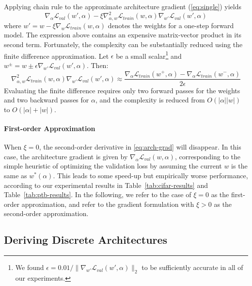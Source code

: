 \documentclass{article}
\begin{document}
Applying chain rule to the approximate architecture gradient (\eqref{eq:single}) yields
\begin{equation}
	\nabla_\alpha \mathcal{L}_{val}(w', \alpha) - \xi \nabla^2_{\alpha, w} \mathcal{L}_{train}(w, \alpha) \nabla_{w'} \mathcal{L}_{val}(w', \alpha) 
        \label{eq:arch-grad}
\end{equation}
where $w' = w - \xi \nabla_w \mathcal{L}_{train}(w, \alpha)$ denotes the weights for a one-step forward model.
The expression above contains an expensive matrix-vector product 
in its second term.
Fortunately,
the complexity can be substantially reduced using the finite difference approximation.
Let $\epsilon$ be a small scalar\footnote{We found $\epsilon = 0.01/\|\nabla_{w'} \mathcal{L}_{val}(w', \alpha)\|_2$ to be sufficiently accurate in all of our experiments.} and
$w^\pm = w \pm \epsilon \nabla_{w'} \mathcal{L}_{val}(w', \alpha)$. Then:
\begin{equation}
	\nabla^2_{\alpha, w} \mathcal{L}_{train}(w, \alpha) \nabla_{w'} \mathcal{L}_{val}(w', \alpha) 
	\approx
	\frac{\nabla_\alpha \mathcal{L}_{train}(w^+, \alpha) - \nabla_\alpha \mathcal{L}_{train}(w^-, \alpha)}{2 \epsilon}
\end{equation}
Evaluating the finite difference requires only two forward passes for the weights and two backward passes for $\alpha$,
and the complexity is reduced from $O(|\alpha||w|)$ to $O(|\alpha|+|w|)$.

\paragraph{First-order Approximation}
When $\xi = 0$,
the second-order derivative in \eqref{eq:arch-grad}
will disappear.
In this case,
the architecture gradient is given by $\nabla_\alpha \mathcal{L}_{val}(w, \alpha)$, %
corresponding to the simple heuristic of optimizing the validation loss by assuming %
the current $w$ is the same as $w^*(\alpha)$.
This leads to some speed-up but empirically worse performance, according to our experimental results in Table~\ref{tab:cifar-results} and Table~\ref{tab:ptb-results}.
In the following,
we refer to the case of $\xi = 0$ as the first-order approximation,
and refer to the gradient formulation with $\xi > 0$ as the second-order approximation.


\subsection{Deriving Discrete Architectures}
\end{document}
